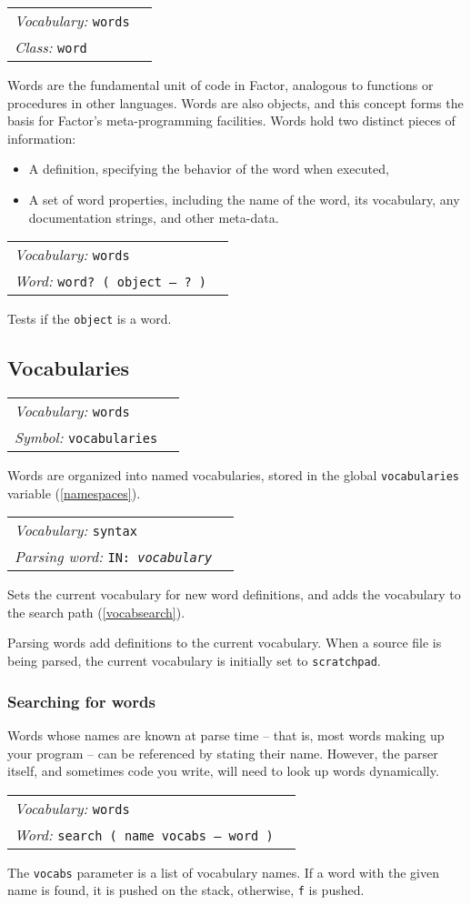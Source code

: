 \documentclass{book}
\newcommand{\vocabulary}[1]{\emph{Vocabulary:} \texttt{#1}&\\}
\newcommand{\parsingword}[2]{\index{\texttt{#1}}\emph{Parsing word:} \texttt{#2}&\\}
\newcommand{\ordinaryword}[2]{\index{\texttt{#1}}\emph{Word:} \texttt{#2}&\\}
\newcommand{\symbolword}[1]{\index{\texttt{#1}}\emph{Symbol:} \texttt{#1}&\\}
\newcommand{\classword}[1]{\index{\texttt{#1}}\emph{Class:} \texttt{#1}&\\}
\newcommand{\wordtable}[1]{

\begin{tabularx}{12cm}[t]{lX}
\hline
#1
\hline
\end{tabularx}

}
\begin{document}
\wordglos
\vocabglos
\newcommand{\definingwordglos}{\glossary{name=defining word,
description=a word that adds definitions to the dictionary}}
\wordtable{
\vocabulary{words}
\classword{word}
}
Words are the fundamental unit of code in Factor, analogous to functions or procedures in other languages. Words are also objects, and this concept forms the basis for Factor's meta-programming facilities. Words hold two distinct pieces of information:
\begin{itemize}
\item A definition, specifying the behavior of the word when executed,
\item A set of word properties, including the name of the word, its vocabulary, any documentation strings, and other meta-data.
\end{itemize}
\wordtable{
\vocabulary{words}
\ordinaryword{word?}{word?~( object -- ?~)}
}
Tests if the \texttt{object} is a word.

\subsection{Vocabularies}
\wordtable{
\vocabulary{words}
\symbolword{vocabularies}
}
Words are organized into named vocabularies, stored in the global \texttt{vocabularies} variable (\ref{namespaces}).
\wordtable{
\vocabulary{syntax}
\parsingword{IN:}{IN:~\emph{vocabulary}}
}
Sets the current vocabulary for new word definitions, and adds the vocabulary to the search path (\ref{vocabsearch}).

Parsing words add definitions to the current vocabulary. When a source file is being parsed, the current vocabulary is initially set to \texttt{scratchpad}.

\subsubsection{Searching for words}

Words whose names are known at parse time -- that is, most words making up your program -- can be referenced by stating their name. However, the parser itself, and sometimes code you write, will need to look up words dynamically.
\wordtable{
\vocabulary{words}
\ordinaryword{search}{search ( name vocabs -- word )}

}
The \texttt{vocabs} parameter is a list of vocabulary names. If a word with the given name is found, it is pushed on the stack, otherwise, \texttt{f} is pushed.
\end{document}

